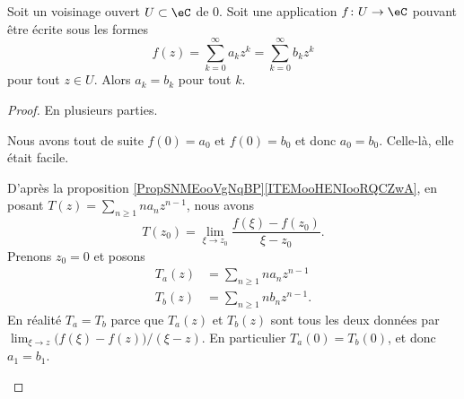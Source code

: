 \begin{proposition}	\label{PROPooVUEYooYemzhe}
	Soit un voisinage ouvert \( U\subset \eC\) de \( 0\). Soit une application \(f \colon U\to \eC  \) pouvant être écrite sous les formes
	\begin{equation}
		f(z)=\sum_{k=0}^{\infty}a_kz^k=\sum_{k=0}^{\infty}b_kz^k
	\end{equation}
	pour tout \( z\in U\). Alors \( a_k=b_k\) pour tout \( k\).
\end{proposition}

\begin{proof}
	En plusieurs parties.

	\begin{subproof}
		\spitem[Pour \( k=0\)]

		Nous avons tout de suite \( f(0)=a_0\) et \( f(0)=b_0\) et donc \( a_0=b_0\). Celle-là, elle était facile.

		\spitem[Pour \( k=1\)]

		D'après la proposition \ref{PropSNMEooVgNqBP}\ref{ITEMooHENIooRQCZwA}, en posant \( T(z)=\sum_{n\geq 1}na_nz^{n-1}\), nous avons
		\begin{equation}
			T(z_0)=\lim_{\xi\to z_0}\frac{ f(\xi)-f(z_0) }{ \xi-z_0 }.
		\end{equation}
		Prenons \( z_0=0\) et posons
		\begin{subequations}
			\begin{align}
				T_a(z) & =\sum_{n\geq 1}na_nz^{n-1}   \\
				T_b(z) & =\sum_{n\geq 1}nb_nz^{n-1} .
			\end{align}
		\end{subequations}
		En réalité \( T_a=T_b\) parce que \( T_a(z)\) et \( T_b(z)\) sont tous les deux données par \( \lim_{\xi\to z}\big( f(\xi)-f(z) \big)/(\xi-z)\). En particulier \( T_a(0)=T_b(0)\), et donc \( a_1=b_1\).


\end{subproof}
\end{proof}
